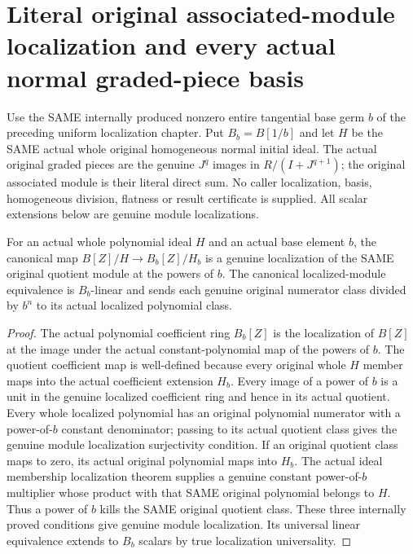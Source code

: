 \section{Literal original associated-module localization and every actual normal graded-piece basis}
Use the SAME internally produced nonzero entire tangential base germ $b$ of
the preceding uniform localization chapter. Put $B_b=B[1/b]$ and let $H$ be
the SAME actual whole original homogeneous normal initial ideal. The actual
original graded pieces are the genuine $J^q$ images in $R/(I+J^{q+1})$;
the original associated module is their literal direct sum. No caller
localization, basis, homogeneous division, flatness or result certificate is
supplied. All scalar extensions below are genuine module localizations.

\begin{theorem}
\label{hir:relative-normal-localgraded-actual-quotient-localization}
\leanok
{}
For an actual whole polynomial ideal $H$ and an actual base element $b$, the
canonical map $B[Z]/H\longrightarrow B_b[Z]/H_b$ is a genuine localization of
the SAME original quotient module at the powers of $b$. The canonical
localized-module equivalence is $B_b$-linear and sends each genuine original
numerator class divided by $b^n$ to its actual localized polynomial class.
\end{theorem}
\begin{proof}
The actual polynomial coefficient ring $B_b[Z]$ is the localization of
$B[Z]$ at the image under the actual constant-polynomial map of the powers
of $b$. The quotient coefficient map is well-defined because every original
whole $H$ member maps into the actual coefficient extension $H_b$.
Every image of a power of $b$ is a unit in the genuine localized coefficient
ring and hence in its actual quotient. Every whole localized polynomial
has an original polynomial numerator with a power-of-$b$ constant denominator;
passing to its actual quotient class gives the genuine module localization
surjectivity condition. If an original quotient class maps to zero, its
actual original polynomial maps into $H_b$. The actual ideal membership
localization theorem supplies a genuine constant power-of-$b$ multiplier
whose product with that SAME original polynomial belongs to $H$. Thus a
power of $b$ kills the SAME original quotient class. These three internally
proved conditions give genuine module localization. Its universal
linear equivalence extends to $B_b$ scalars by true localization universality.
\end{proof}

